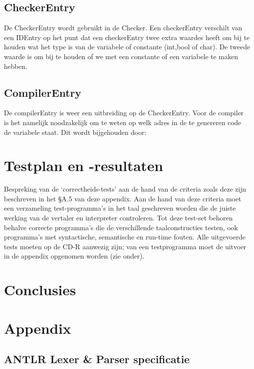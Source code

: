 \documentclass[]{article}
\begin{document}
\subsection{CheckerEntry}
De CheckerEntry wordt gebruikt in de Checker. Een checkerEntry verschilt van een IDEntry op het punt dat een checkerEntry twee extra waardes heeft om bij te houden wat het type is van de variabele of constante (int,bool of char). De tweede waarde is om bij te houden of we met een constante of een variabele te maken hebben.


\subsection{CompilerEntry}
De compilerEntry is weer een uitbreiding op de CheckerEntry. Voor de compiler is het namelijk noodzakelijk om te weten op welk adres in de te genereren code de variabele staat. Dit wordt bijgehouden door:


\newpage
\section{Testplan en -resultaten}
Bespreking van de ‘correctheids-tests’ aan de hand van de criteria
zoals deze zijn beschreven in het §A.5 van deze appendix. Aan de hand van deze criteria moet
een verzameling test-programma’s in het taal geschreven worden die de juiste werking van de
vertaler en interpreter controleren. Tot deze test-set behoren behalve correcte programma’s
die de verschillende taalconstructies testen, ook programma’s met syntactische, semantische
en run-time fouten.
Alle uitgevoerde tests moeten op de CD-R aanwezig zijn; van een testprogramma moet de
uitvoer in de appendix opgenomen worden (zie onder).

\newpage
\section{Conclusies}



\newpage
\section{Appendix}

\subsection{ANTLR Lexer \& Parser specificatie}
\end{document}
